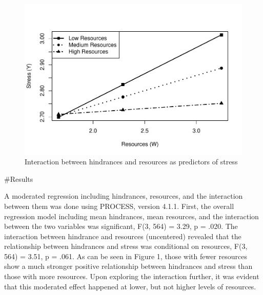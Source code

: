 \documentclass[
  man]{apa6}
\begin{document}
\begin{figure}
\centering
\includegraphics{SIOP_PROCESS_files/figure-latex/analyses-1.pdf}
\caption{\label{fig:analyses}Interaction between hindrances and resources as predictors of stress}
\end{figure}

\#Results

A moderated regression including hindrances, resources, and the interaction between them was done using PROCESS, version 4.1.1. First, the overall regression model including mean hindrances, mean resources, and the interaction between the two variables was significant, F(3, 564) = 3.29, p = .020. The interaction between hindrance and resources (uncentered) revealed that the relationship between hindrances and stress was conditional on resources, F(3, 564) = 3.51, p = .061. As can be seen in Figure 1, those with fewer resources show a much stronger positive relationship between hindrances and stress than those with more resources. Upon exploring the interaction further, it was evident that this moderated effect happened at lower, but not higher levels of resources.
\end{document}
